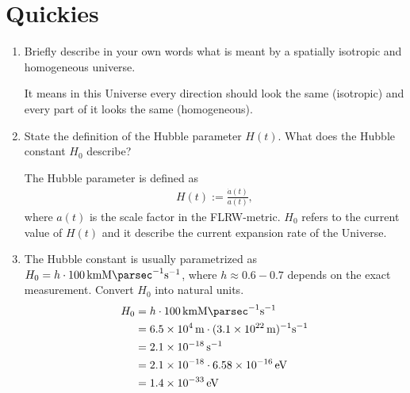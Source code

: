 \section{Quickies}
\begin{enumerate}[label=(\alph*)]
   \item Briefly describe in your own words what is meant by a spatially isotropic and homogeneous universe.

      It means in this Universe every direction should look the same (isotropic) and every part of it looks the same (homogeneous).
   \item State the definition of the Hubble parameter $H(t)$. What does the Hubble constant $H_0$ describe?

      The Hubble parameter is defined as
      \begin{align}
         H(t) := \frac{\dot{a}(t)}{a(t)},
      \end{align}
      where $a(t)$ is the scale factor in the FLRW-metric. $H_0$ refers to the current value of $H(t)$ and it describe the current expansion rate of the Universe.

   \item The Hubble constant is usually parametrized as $H_0 = h \cdot \SI{100}{\km \mega \parsec \tothe{-1} \s\tothe{-1}}$, where $h \approx 0.6 - 0.7$ depends on the exact measurement. Convert $H_0$ into natural units.
      \begin{align*}
         H_0 &= h \cdot \SI{100}{\km \mega \parsec \tothe{-1} \s\tothe{-1}} \\
             &= \SI{6.5e4}{m} \cdot (\SI{3.1e22}{m})^{-1} \si{\s \tothe{-1}} \\
             &= \SI{2.1e-18}{\s\tothe{-1}} \\
             &= \num{2.1e-18} \cdot \SI{6.58e-16}{\eV}\\
             &= \SI{1.4e-33}{\eV}
      \end{align*}
\end{enumerate}
